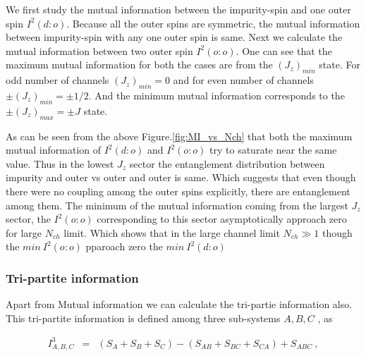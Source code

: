 \documentclass[reprint,prb,superscriptaddress]{revtex4-1}
\begin{document}
We first study the mutual information between the impurity-spin and one outer spin $I^2(d:o)$. Because all the outer spins are symmetric, the mutual information between impurity-spin with any one outer spin is same. Next we calculate the mutual information between two outer spin $I^2(o:o)$. One can see that the maximum mutual information for both the cases are from the $(J_z)_{min}$ state. For odd number of channels $(J_z)_{min}=0$ and for even number of channels $\pm (J_z)_{min}=\pm 1/2$. And the minimum mutual information corresponds to the $\pm (J_z)_{max}=\pm J$ state.\\

\par As can be seen from the above Figure.\ref{fig:MI_vs_Nch} that  both the maximum mutual information of $I^2(d:o)$ and $I^2(o:o)$ try to saturate near the same value. Thus in the lowest $J_z$ sector the entanglement distribution between impurity and outer vs outer and outer is same. Which suggests that even though there were no coupling among the outer spins explicitly, there are entanglement among them. The minimum of the mutual information coming from the largest $J_z$ sector, the $I^2(o:o)$ corresponding to this sector asymptotically approach zero for large $N_{ch}$ limit. Which shows that in the large channel limit $N_{ch}\gg 1$ though the $min~I^2(o:o)$ pparoach zero the $min~ I^2(d:o)$ 

\subsubsection{Tri-partite information}
\noindent Apart from Mutual information we can calculate the tri-partie information also. This tri-partite information is defined among three sub-systems $A,B,C$ , as 

\begin{eqnarray}
I^3_{A,B,C} &=& (S_A+S_B+S_C)-(S_{AB}+S_{BC}+S_{CA})+S_{ABC}~,
\end{eqnarray}
\end{document}
